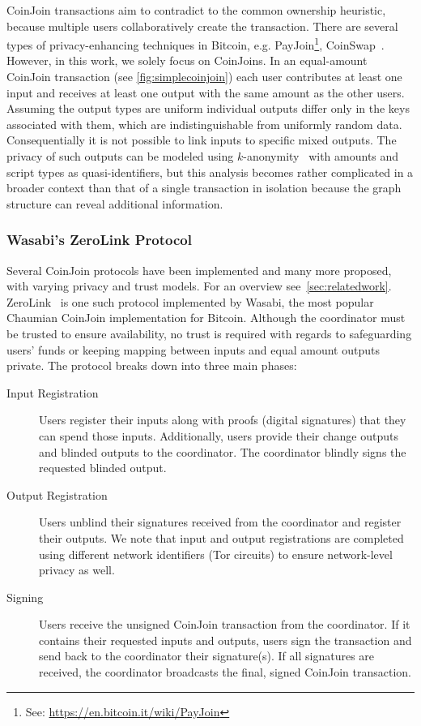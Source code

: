 \documentclass[a4paper]{article}
\begin{document}
CoinJoin transactions aim to contradict to the common ownership heuristic, because multiple users collaboratively create the transaction. There are several types of privacy-enhancing techniques in Bitcoin, e.g. PayJoin\footnote{See: \url{https://en.bitcoin.it/wiki/PayJoin}}, CoinSwap~\cite{belcher2020design}. However, in this work, we solely focus on CoinJoins. In an equal-amount CoinJoin transaction (see \cref{fig:simplecoinjoin}) each user contributes at least one input and receives at least one output with the same amount as the other users. Assuming the output types are uniform individual outputs differ only in the keys associated with them, which are indistinguishable from uniformly random data. Consequentially it is not possible to link inputs to specific mixed outputs. The privacy of such outputs can be modeled using $k$-anonymity~\cite{sweeney2002k} with amounts and script types as quasi-identifiers, but this analysis becomes rather complicated in a broader context than that of a single transaction in isolation because the graph structure can reveal additional information.

\subsubsection{Wasabi's ZeroLink Protocol}

Several CoinJoin protocols have been implemented and many more proposed, with varying privacy and trust models. For an overview see~\cref{sec:relatedwork}. ZeroLink~\cite{zerolink} is one such protocol implemented by Wasabi, the most popular Chaumian CoinJoin implementation for Bitcoin. Although the coordinator must be trusted to ensure availability, no trust is required with regards to safeguarding users' funds or keeping mapping between inputs and equal amount outputs private. The protocol breaks down into three main phases:

\begin{description}
 \item[Input Registration] Users register their inputs along with proofs (digital signatures) that they can spend those inputs. Additionally, users provide their change outputs and blinded outputs to the coordinator. The coordinator blindly signs the requested blinded output.
 \item[Output Registration] Users unblind their signatures received from the coordinator and register their outputs. We note that input and output registrations are completed using different network identifiers (Tor circuits) to ensure network-level privacy as well.
 \item[Signing] Users receive the unsigned CoinJoin transaction from the coordinator. If it contains their requested inputs and outputs, users sign the transaction and send back to the coordinator their signature(s). If all signatures are received, the coordinator broadcasts the final, signed CoinJoin transaction.
\end{description}
\end{document}
